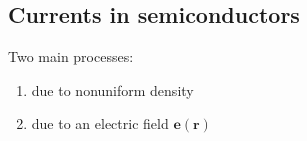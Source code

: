 \documentclass[letterpaper,10pt,english]{jupyterBook}
\begin{document}
\subsection{Currents in semiconductors}
\label{\detokenize{ch/solid-state/semiconductors-transport-phenomena:currents-in-semiconductors}}\label{\detokenize{ch/solid-state/semiconductors-transport-phenomena:semiconductors-transport-phenomena-currents}}
\sphinxAtStartPar
Two main processes:
\begin{enumerate}
%
\item {} 
\sphinxAtStartPar
{} due to non\sphinxhyphen{}uniform density

\item {} 
\sphinxAtStartPar
{} due to an electric field \(\mathbf{e}(\mathbf{r})\)

\end{enumerate}
\end{document}
